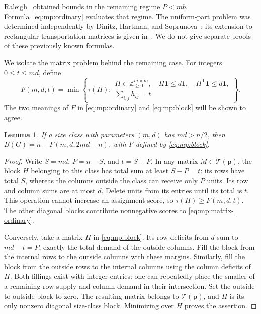 \documentclass[11pt,reqno]{amsart}
\numberwithin{equation}{section}
\newtheorem{lemma}[theorem]{Lemma}
\theoremstyle{definition}
\theoremstyle{remark}
\begin{document}
Raleigh~\cite[Theorems~2--3]{raleigh2018} obtained bounds in the
remaining regime $P<mb$. Formula~\eqref{eq:mp:ordinary} evaluates
that regime. The uniform-part problem was determined independently
by Dinitz, Hartman, and Soprunova~\cite{dinitz2012}; its extension
to rectangular transportation matrices is given in~\cite{gajula2015}.
We do not give separate proofs of these previously known formulas.

We isolate the matrix problem behind the remaining case. For integers
$0\le t\le md$, define
\begin{equation}\label{eq:mp:block}
 F(m,d,t)=\min\left\{\tau(H):
 \begin{array}{l}
 H\in\mathbb Z_{\ge0}^{m\times m},\quad
 H\mathbf1\le d\mathbf1,\quad H^{\mathsf T}\mathbf1\le d\mathbf1,\\
 \displaystyle\sum_{i,j}h_{ij}=t
 \end{array}\right\}.
\end{equation}
The two meanings of $F$ in \eqref{eq:mp:ordinary} and
\eqref{eq:mp:block} will be shown to agree.

\begin{lemma}\label{lem:mp:dominant-block}
If a size class with parameters $(m,d)$ has $md>n/2$, then
$B(G)=n-F(m,d,2md-n)$, with $F$ defined by \eqref{eq:mp:block}.
\end{lemma}
\begin{proof}
Write $S=md$, $P=n-S$, and $t=S-P$. In any matrix
$M\in\mathcal T(\mathbf p)$, the block $H$ belonging to this class
has total sum at least $S-P=t$: its rows have total $S$, whereas the
columns outside the class can receive only $P$ units. Its row and column
sums are at most $d$. Delete units from its entries until its total is
$t$. This operation cannot increase an assignment score, so
$\tau(H)\ge F(m,d,t)$. The other diagonal blocks contribute
nonnegative scores to \eqref{eq:mp:matrix-ordinary}.

Conversely, take a matrix $H$ in \eqref{eq:mp:block}. Its row deficits
from $d$ sum to $md-t=P$, exactly the total demand of the outside
columns. Fill the block from the internal rows to the outside columns
with these margins. Similarly, fill the block from the outside rows to
the internal columns using the column deficits of $H$. Both fillings
exist with integer entries: one can repeatedly place the smaller of a
remaining row supply and column demand in their intersection. Set the
outside-to-outside block to zero. The resulting matrix belongs to
$\mathcal T(\mathbf p)$, and $H$ is its only nonzero diagonal size-class
block. Minimizing over $H$ proves the assertion.
\end{proof}
\end{document}
